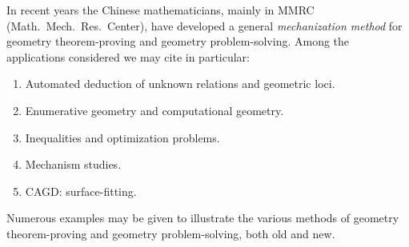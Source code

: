       In recent years the Chinese mathematicians, mainly in MMRC (Math.\
   Mech.\ Res.\ Center), have developed a general {\em mechanization 
   method\/} for geometry theorem-proving and geometry problem-solving.  
   Among the applications considered we may cite in particular:
\begin{enumerate}
\item  Automated deduction of unknown relations and geometric loci.

\item  Enumerative geometry and computational geometry.

\item  Inequalities and optimization problems.

\item  Mechanism studies.

\item  CAGD: surface-fitting.
\end{enumerate}

      Numerous examples may be given to illustrate the various methods of
   geometry theorem-proving and geometry problem-solving, both old and new.


